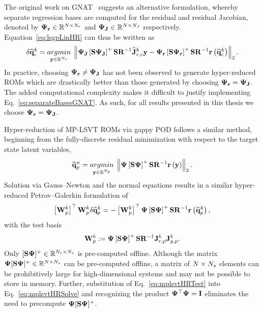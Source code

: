 %
The original work on GNAT~\cite{Carlberg2013} suggests an alternative formulation, whereby separate regression bases are computed for the residual and residual Jacobian, denoted by $\deimBasisRes \inRTwo{\numDOF}{\numResModes}$ and $\deimBasisJacob \inRTwo{\numDOF}{\numJacobModes}$ respectively. Equation~\ref{eq:lsgpLinHR} can thus be written as
%
\begin{equation}\label{eq:separateBasesGNAT}
    \delta \consVecCoef^{\newtonIdx} = \argmin{\dummyVec \inROne{\numConsModes}} \left\Vert \deimBasisJacob \left[ \sampMat \deimBasisJacob \right]^{+} \sampMat \resScaleInv \jacobResCoefCons^{\newtonIdx} \dummyVec - \deimBasisRes \left[ \sampMat \deimBasisRes \right]^{+} \sampMat \resScaleInv \resFunc{\consVecCoef^{\newtonIdx}} \right\Vert_2.
\end{equation}
%
In practice, choosing $\deimBasisRes \neq \deimBasisJacob$ has not been observed to generate hyper-reduced ROMs which are drastically better than those generated by choosing $\deimBasisRes = \deimBasisJacob$. The added computational complexity makes it difficult to justify implementing Eq.~\ref{eq:separateBasesGNAT}. As such, for all results presented in this thesis we choose $\deimBasisRes = \deimBasisJacob$.

Hyper-reduction of MP-LSVT ROMs via gappy POD follows a similar method, beginning from the fully-discrete residual minimization with respect to the target state latent variables,
%
\begin{equation}
    \primVecCoef^{\timeIdx} = \argmin{\dummyVec \inROne{\numPrimModes}} \left\Vert \deimBasis \left[ \sampMat \deimBasis \right]^{+} \sampMat \resScaleInv \resFunc{\dummyVec} \right\Vert_2.
\end{equation}
%
Solution via Gauss--Newton and the normal equations results in a similar hyper-reduced Petrov--Galerkin formulation of
%
\begin{equation}\label{eq:mplsvtHRSolve}
    \left[ \testBasisPrim^\newtonIdx \right]^\top \testBasisPrim^\newtonIdx \delta \primVecCoef^{\newtonIdx} = -\left[\testBasisPrim^\newtonIdx \right]^\top \deimBasis \left[ \sampMat \deimBasis \right]^{+} \sampMat \resScaleInv \resFunc{\primVecCoef^{\newtonIdx}},
\end{equation}
%
with the test basis
%
\begin{equation}\label{eq:mplsvtHRTest}
    \testBasisPrim^\newtonIdx \defEq \deimBasis \left[ \sampMat \deimBasis \right]^{+} \sampMat \resScaleInv \jacobResPrim^{\newtonIdx} \jacobDecodePrim^{\newtonIdx}.
\end{equation}
%
Only $[ \sampMat \deimBasis ]^{+} \inRTwo{\numResModes}{\numSamps}$ is pre-computed offline. Although the matrix $\deimBasis [ \sampMat \deimBasis ]^{+} \inRTwo{\numDOF}{\numSamps}$ can be pre-computed offline, a matrix of $N \times N_s$ elements can be prohibitively large for high-dimensional systems and may not be possible to store in memory. Further, substitution of Eq.~\ref{eq:mplsvtHRTest} into Eq.~\ref{eq:mplsvtHRSolve} and recognizing the product $\deimBasis^\top \deimBasis = \identMat$ eliminates the need to precompute $\deimBasis [ \sampMat \deimBasis ]^{+}$.

